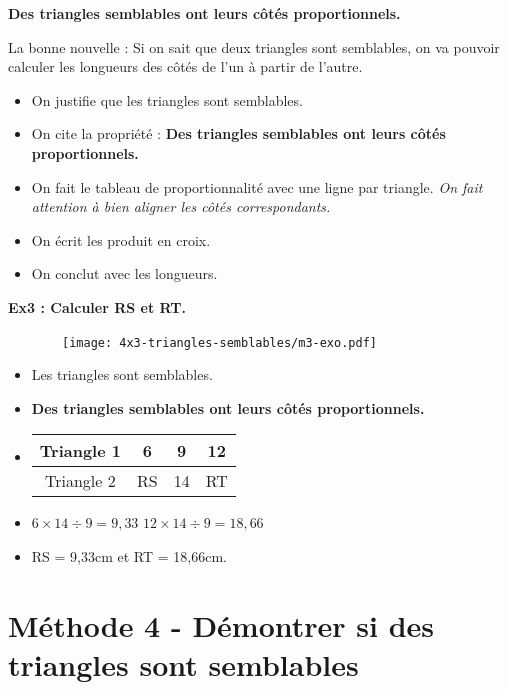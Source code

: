 \textbf{Des triangles semblables ont leurs côtés proportionnels.}

La bonne nouvelle : Si on sait que deux triangles sont semblables, on va pouvoir calculer les longueurs des côtés de l'un à partir de l'autre. 

\begin{itemize}
  \item On justifie que les triangles sont semblables.
  \item On cite la propriété : \textbf{Des triangles semblables ont leurs côtés proportionnels.} 
  \item On fait le tableau de proportionnalité avec une ligne par triangle. \textit{On fait attention à bien aligner les côtés correspondants.}
  \item On écrit les produit en croix. 
  \item On conclut avec les longueurs. 
\end{itemize}

\horrule{1px}
\textbf{Ex3 : Calculer RS et RT.}

\begin{multicols}{2}

  \begin{figure}[H]
    \centering
    \texttt{[image: 4x3-triangles-semblables/m3-exo.pdf]}
  \end{figure}
  \columnbreak

  \begin{itemize}
    \item Les triangles sont semblables.
    \item \textbf{Des triangles semblables ont leurs côtés proportionnels.} 
    \item     
    \begin{tabular}{|c|c|c|c|}
      \hline
      Triangle 1 & 6 & 9 & 12 \\  \hline
      Triangle 2 & RS & 14 & RT\\  \hline
    \end{tabular}
    \item $6  \times 14 \div 9 = 9,33$ \newline
          $12 \times 14 \div 9 = 18,66$
    \item RS = 9,33cm et RT = 18,66cm.
  \end{itemize}

\end{multicols}

\section*{Méthode 4 - Démontrer si des triangles sont semblables}

